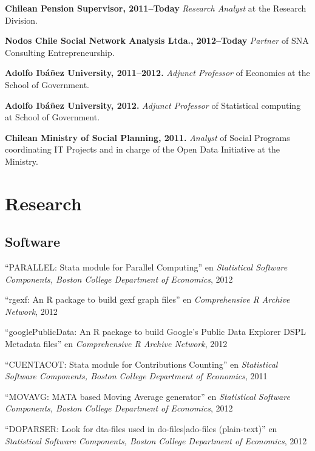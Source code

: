 \documentclass[letterpaper, 12pt]{article}
\renewenvironment{itemize}{
  \begin{list}{}{
    \setlength{\leftmargin}{0.45cm}
  }
}{
  \end{list}
}
\begin{document}
\begin{itemize}
\item \textbf{Chilean Pension Supervisor, 2011--Today} \emph{Research Analyst} at the Research Division.
\item \textbf{Nodos Chile Social Network Analysis Ltda., 2012--Today} \emph{Partner} of SNA Consulting Entrepreneurship.
\item \textbf{Adolfo Ibáñez University, 2011--2012.} \emph{Adjunct Professor} of Economics at the School of Government.
\item \textbf{Adolfo Ibáñez University, 2012.} \emph{Adjunct Professor} of Statistical computing at School of Government.
\item \textbf{Chilean Ministry of Social Planning, 2011.} \emph{Analyst} of Social Programs coordinating IT Projects and in charge of the Open Data Initiative at the Ministry.
\end{itemize}

\section*{Research}
\subsection*{Software}
\begin{itemize}
\item ``PARALLEL: Stata module for Parallel Computing'' en {\it Statistical Software Components, Boston College Department of Economics}, 2012
\item ``rgexf: An R package to build gexf graph files'' en {\it Comprehensive R Archive Network}, 2012
\item ``googlePublicData: An R package to build Google's Public Data Explorer DSPL Metadata files'' en {\it Comprehensive R Archive Network}, 2012
\item ``CUENTACOT: Stata module for Contributions Counting'' en {\it Statistical Software Components, Boston College Department of Economics}, 2011
\item ``MOVAVG: MATA based Moving Average generator'' en {\it Statistical Software Components, Boston College Department of Economics}, 2012
\item ``DOPARSER: Look for dta-files used in do-files|ado-files (plain-text)'' en {\it Statistical Software Components, Boston College Department of Economics}, 2012
\end{itemize}
\end{document}
